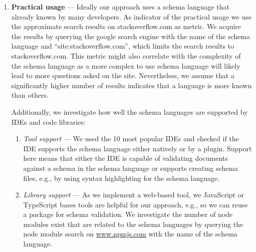 \begin{enumerate}
    \item \textbf{Practical usage} --- Ideally our approach uses a schema language that already known by many developers.
    As indicator of the practical usage we use the approximate search results on stackoverflow.com as metric.
    We acquire the results by querying the google search engine with the name of the schema language and ``site:stackoverflow.com'', which limits the search results to stackoverflow.com.
    This metric might also correlate with the complexity of the schema language as a more complex to use schema language will likely lead to more questions asked on the site.
    Nevertheless, we assume that a significantly higher number of results indicates that a language is more known than others.

    Additionally, we investigate how well the schema languages are supported by IDEs and code libraries:
    \begin{enumerate}
        \item \textit{Tool support} --- We used the 10 most popular IDEs\cite{mostpopularides} and checked if the IDE supports the schema language either natively or by a plugin.
        Support here means that either the IDE is capable of validating documents against a schema in the schema language or supports creating schema files, e.g., by using syntax highlighting for the schema language.
        \item \textit{Library support} --- As we implement a web-based tool, we JavaScript or TypeScript bases tools are helpful for our approach, e.g., so we can reuse a package for schema validation.
        We investigate the number of node modules exist that are related to the schema languages by querying the node module search on \url{www.npmjs.com} with the name of the schema language.

    \end{enumerate}


\end{enumerate}
